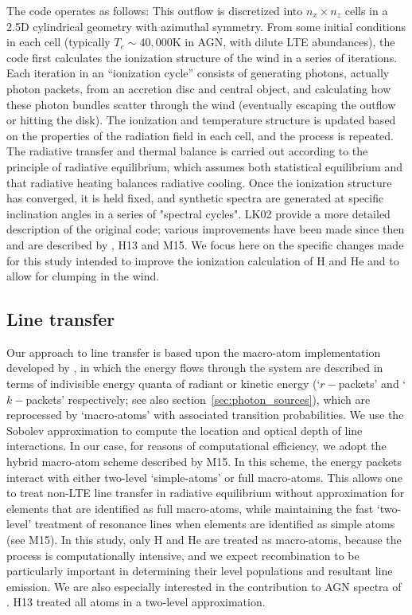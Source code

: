 \documentclass[useAMS,usenatbib]{mn2e_x}
\begin{document}
The code operates as follows:   This outflow is discretized into $n_x \times n_z$ cells in a 2.5D
cylindrical geometry with azimuthal symmetry. 
From some initial conditions in each cell (typically $T_e \sim 40,000$K in AGN, with 
dilute LTE abundances), 
the code first calculates the ionization structure of the wind in a series of iterations. 
Each iteration in an ``ionization cycle'' consists of generating photons, actually photon packets, 
from an accretion disc and central object, and calculating how these photon 
bundles scatter through the wind (eventually escaping the outflow or hitting the disk). 
The ionization and temperature structure is updated based on the properties of the 
radiation field in each cell, and the process is repeated. The radiative transfer and thermal
balance is carried out according to the principle of radiative equilibrium, 
which assumes both statistical equilibrium and that radiative heating balances radiative cooling.
Once the ionization structure has converged, it is held fixed, 
and synthetic spectra are generated at specific inclination 
angles in a series of "spectral cycles". LK02 provide a more detailed  
description of the original code; various improvements have been made 
since then and are described by \cite{simmacro2005}, H13 and M15.  
We focus here on the specific changes made for this study
intended to improve the ionization calculation of H and He
and to allow for clumping in the wind.


\subsection{Line transfer}

Our approach to line transfer is based upon the macro-atom implementation developed by 
\cite{lucy2002, lucy2003}, in which the energy flows through the system are described in 
terms of indivisible energy quanta of radiant or kinetic energy 
(`$r-$packets' and `$k-$packets' respectively; see also section~\ref{sec:photon_sources}),
which are reprocessed by `macro-atoms' with associated transition probabilities.
We use the Sobolev approximation \citep[e.g.][]{sobolev1957,sobolev1960,rybickihummer1978}
to compute the location and optical depth of line interactions.
In our case, for reasons of computational efficiency, we adopt the  hybrid macro-atom scheme 
described by M15. In this scheme, the energy packets interact with either two-level 
`simple-atoms' or full macro-atoms. 
This allows one to treat non-LTE line transfer in radiative equilibrium
without approximation for elements that are identified as 
full macro-atoms, while maintaining the fast `two-level' 
treatment of resonance lines when elements are identified 
as simple atoms (see M15). In this study,
only H and He are treated as macro-atoms, because the process is computationally
intensive, and we expect recombination to be particularly important
in determining their level populations and resultant line emission.
We are also especially interested in the contribution to 
AGN spectra of \LA.  H13 treated all atoms in a two-level approximation.  
\end{document}
